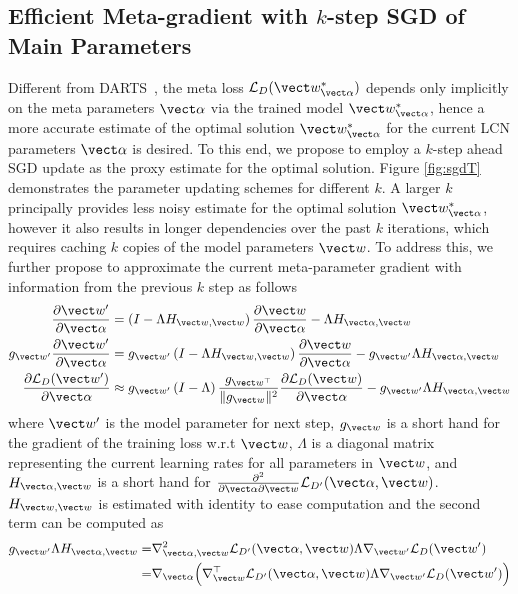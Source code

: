 \subsection{Efficient Meta-gradient with $k$-step SGD of Main Parameters}

Different from DARTS~\cite{liu2018darts}, the meta loss
$\mathcal{L}_{D}(\vect w^*_{\vect \alpha})$ depends only implicitly on the meta parameters $\vect
\alpha$ via the trained model $\vect w^*_{\vect \alpha}$, hence a more
accurate estimate of the optimal solution $\vect w^*_{\vect \alpha}$
for the current LCN parameters $\vect\alpha$ is desired. To this end, we propose
to employ a $k$-step ahead SGD update as the proxy estimate for the
optimal solution. Figure \ref{fig:sgdT} demonstrates the parameter
updating schemes for different $k$. A larger $k$ principally provides
less noisy estimate for the optimal solution $\vect
w^*_{\vect\alpha}$, however it also results in longer dependencies
over the past $k$ iterations, which requires caching $k$ copies of the
model parameters $\vect w$. To address this, we further propose to approximate the
current meta-parameter gradient with information from the previous $k$
step as follows\begin{align}
  \frac{\partial \vect w'}{\partial \vect\alpha}&=\left(I-\Lambda H_{\vect w,\vect w}\right)\frac{\partial \vect w}{\partial \vect\alpha}-\Lambda H_{\vect\alpha, \vect w}\\
  g_{\vect w'}\frac{\partial \vect w'}{\partial \vect\alpha}&=g_{\vect w'}\left(I-\Lambda H_{\vect w,\vect w}\right)\frac{\partial \vect w}{\partial \vect\alpha}-g_{\vect w'}\Lambda H_{\vect\alpha, \vect w}\\
\frac{\partial \mathcal{L}_D(\vect w')}{\partial \vect\alpha}&\approx g_{\vect w'}\left(I-\Lambda \right)\frac{g_{\vect w^\top}}{\|g_{\vect w}\|^2}\frac{\partial \mathcal{L}_D(\vect w)}{\partial \vect\alpha}-g_{\vect w'}\Lambda H_{\vect\alpha, \vect w}
 \label{eq:mgradient}
\end{align}
where $\vect w'$ is the model parameter for next step, $g_{\vect w}$
is a short hand for the gradient of the training loss w.r.t $\vect w$,
$\Lambda$ is a diagonal matrix representing the current learning rates
for all parameters in $\vect w$, and $H_{\vect \alpha, \vect w}$ is a
short hand for $\frac{\partial^2}{\partial\vect\alpha\partial\vect
  w}\mathcal{L}_{D'}(\vect\alpha, \vect w)$. $H_{\vect w,\vect w}$ is
estimated with identity to ease computation and the second term can be
computed as
\begin{align}
  g_{\vect w'}\Lambda H_{\vect\alpha, \vect w} =& \nabla_{\vect \alpha, \vect  w}^2\mathcal{L}_{D'}(\vect \alpha, \vect w)\Lambda\nabla_{\vect w'}\mathcal{L}_{D}(\vect w')\nonumber\\
  =&\nabla_{\vect \alpha}\Big(\nabla_{\vect  w}^\top\mathcal{L}_{D'}(\vect \alpha, \vect w)\Lambda\nabla_{\vect w'}\mathcal{L}_{D}(\vect w')\Big)
\end{align}

